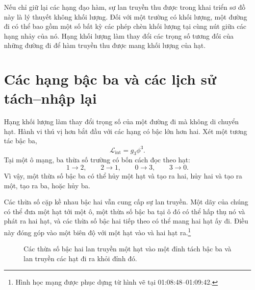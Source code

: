Nếu chỉ giữ lại các hạng đạo hàm, sự lan truyền thu được trong khai triển sơ đồ này là lý thuyết không khối lượng. Đối với một trường có khối lượng, một đường đi có thể bao gồm một số bất kỳ các phép chèn khối lượng tại cùng nút giữa các hạng nhảy của nó. Hạng khối lượng làm thay đổi các trọng số tương đối của những đường đi để hàm truyền thu được mang khối lượng của hạt.

\section{Các hạng bậc ba và các lịch sử tách--nhập lại}

Hạng khối lượng làm thay đổi trọng số của một đường đi mà không di chuyển hạt. Hành vi thú vị hơn bắt đầu với các hạng có bậc lớn hơn hai. Xét một tương tác bậc ba,
\begin{equation}
\mathcal{L}_{\mathrm{int}}=g_3\phi^3.
\end{equation}
Tại một ô mạng, ba thừa số trường có bốn cách đọc theo hạt:
\begin{equation}
1\longrightarrow 2,
\qquad
2\longrightarrow 1,
\qquad
0\longrightarrow 3,
\qquad
3\longrightarrow 0.
\end{equation}
Vì vậy, một thừa số bậc ba có thể hủy một hạt và tạo ra hai, hủy hai và tạo ra một, tạo ra ba, hoặc hủy ba.

Các thừa số cặp kề nhau bậc hai vẫn cung cấp sự lan truyền. Một dãy của chúng có thể đưa một hạt tới một ô, một thừa số bậc ba tại ô đó có thể hấp thụ nó và phát ra hai hạt, và các thừa số bậc hai tiếp theo có thể mang hai hạt ấy đi. Điều này đóng góp vào một biên độ với một hạt vào và hai hạt ra.\footnote{Hình học mạng được phục dựng từ hình vẽ tại 01:08:48--01:09:42.}

\begin{figure}[htbp]
\centering
{}
\caption{Các thừa số bậc hai lan truyền một hạt vào một đỉnh tách bậc ba và lan truyền các hạt đi ra khỏi đỉnh đó.}
\end{figure}


